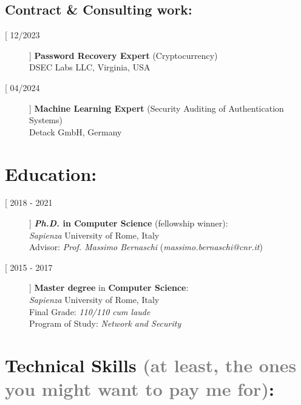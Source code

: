 \documentclass[margin, 10pt]{article} %
\begin{document}
\begin{description}
\section*{\normalsize{Contract \& Consulting work:}}
\vspace{-.35cm}
\begin{description}
	\item[[ 12/2023]] \textbf{Password Recovery Expert} (Cryptocurrency)\\
	 DSEC Labs LLC, Virginia, USA
	 \item[[ 04/2024]] \textbf{Machine Learning Expert} (Security Auditing of Authentication Systems)\\
	Detack GmbH, Germany\\
	
\end{description}
\end{description}
\noindent\makebox[\linewidth]{\rule{.2\paperwidth}{0.3pt}}


\section*{Education:} 

\begin{description}
\item[[ 2018 - 2021]] \textbf{\textit{Ph.D.}  in  Computer Science} (fellowship winner):\\
\textit{Sapienza} University of Rome, Italy\\
Advisor: \textit{Prof. Massimo Bernaschi} (\textit{massimo.bernaschi@cnr.it})\\


\item[[ 2015 - 2017]] \textbf{Master degree} in  \textbf{Computer Science}: \\
\textit{Sapienza} University of Rome, Italy\\
Final Grade: \textit{110/110} \textit{cum laude}\\
Program of Study: \textit{Network and Security}

\end{description}


\noindent\makebox[\linewidth]{\rule{.2\paperwidth}{0.3pt}}


\ifita
\section*{Technical Skills  \small{\textcolor{gray}{(at least, the ones you might want to pay me for)}}:}
\else
\end{document}
